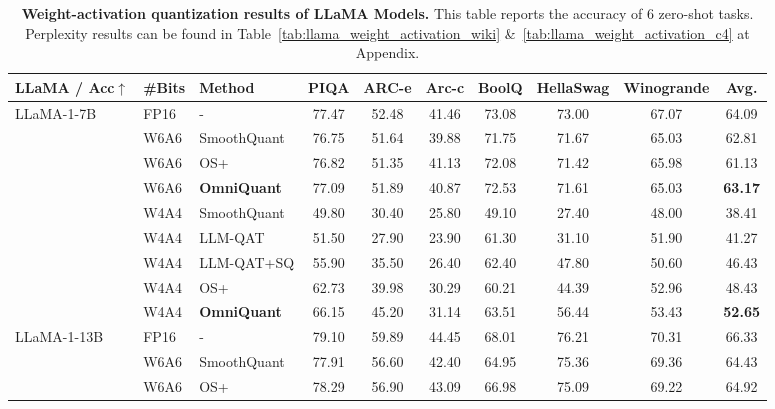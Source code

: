 \documentclass{article} %
\begin{document}
\begin{table}[t]
    \setlength{\tabcolsep}{3pt}
    \small
    \centering
    \renewcommand{\arraystretch}{0.7}
    \caption{\textbf{Weight-activation quantization results of LLaMA Models.} This table reports the accuracy of 6 zero-shot tasks. Perplexity results can be found in Table~\ref{tab:llama_weight_activation_wiki} \&~\ref{tab:llama_weight_activation_c4} at Appendix.}
    \begin{tabular}{lllccccccc}
        \hline
          \multicolumn{1}{l}{\textbf{LLaMA / Acc}$\uparrow$} & \#Bits & Method  & PIQA  & ARC-e & Arc-c & BoolQ & HellaSwag & Winogrande & \textbf{Avg.} \\  \hline
        \multirow{7}{*}{LLaMA-1-7B} &
        FP16 & - & 77.47  & 52.48 & 41.46 & 73.08 & 73.00 & 67.07 & 64.09  \\
        & W6A6 & SmoothQuant & 76.75 & 51.64 & 39.88 & 71.75 & 71.67 & 65.03 & 62.81 \\
         & W6A6 & OS+ & 76.82 & 51.35 & 41.13 & 72.08 & 71.42 & 65.98 & 61.13 \\
        & \cellcolor{Gray}W6A6 & \cellcolor{Gray}\textbf{OmniQuant} & \cellcolor{Gray}77.09 & \cellcolor{Gray}51.89 & \cellcolor{Gray}40.87 & \cellcolor{Gray}72.53 & \cellcolor{Gray}71.61 & \cellcolor{Gray}65.03 & \cellcolor{Gray}\textbf{63.17} \\
        & W4A4 & SmoothQuant & 49.80 & 30.40  & 25.80 & 49.10 & 27.40 & 48.00 & 38.41 \\
        & W4A4 & LLM-QAT & 51.50 & 27.90 & 23.90 & 61.30 & 31.10 & 51.90 & 41.27 \\
        & W4A4 & LLM-QAT+SQ & 55.90 & 35.50 & 26.40 & 62.40 & 47.80 & 50.60 & 46.43 \\
        & W4A4 & OS+ & 62.73 & 39.98 & 30.29 & 60.21 & 44.39 & 52.96 & 48.43 \\
        & \cellcolor{Gray}W4A4 & \cellcolor{Gray}\textbf{OmniQuant} & \cellcolor{Gray}66.15 & \cellcolor{Gray}45.20 & \cellcolor{Gray}31.14 & \cellcolor{Gray}63.51 & \cellcolor{Gray}56.44 & \cellcolor{Gray}53.43 & \cellcolor{Gray}\textbf{52.65} \\
        \hline
        \multirow{5}{*}{LLaMA-1-13B} &
        FP16 & - & 79.10  & 59.89 & 44.45 & 68.01 & 76.21 & 70.31 & 66.33  \\
        & W6A6 & SmoothQuant & 77.91 & 56.60 & 42.40 & 64.95 & 75.36 & 69.36 & 64.43 \\
        & W6A6 & OS+ & 78.29 & 56.90 & 43.09 & 66.98 & 75.09 & 69.22 & 64.92 \\

\end{tabular}
\end{table}
\end{document}
